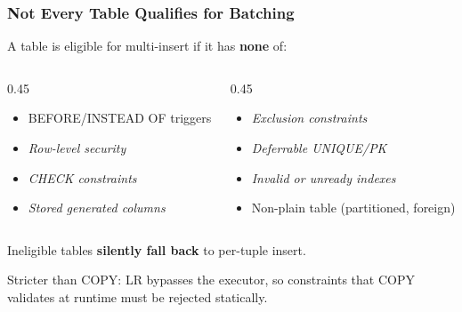 \documentclass{beamer}
\begin{document}
\begin{frame}\frametitle{Not Every Table Qualifies for Batching}
A table is eligible for multi-insert if it has \textbf{none} of:
\bigskip

\begin{columns}[T]
\begin{column}{0.45\textwidth}
\begin{itemize}
  \item BEFORE/INSTEAD OF triggers
  \item \textit{Row-level security}
  \item \textit{CHECK constraints}
  \item \textit{Stored generated columns}
\end{itemize}
\end{column}
\begin{column}{0.45\textwidth}
\begin{itemize}
  \item \textit{Exclusion constraints}
  \item \textit{Deferrable UNIQUE/PK}
  \item \textit{Invalid or unready indexes}
  \item Non-plain table (partitioned, foreign)
\end{itemize}
\end{column}
\end{columns}
\bigskip
Ineligible tables \textbf{silently fall back} to per-tuple insert.

\smallskip
{Stricter than COPY: LR bypasses the executor,
so constraints that COPY validates at runtime must be rejected statically.}
\end{frame}


\end{document}
